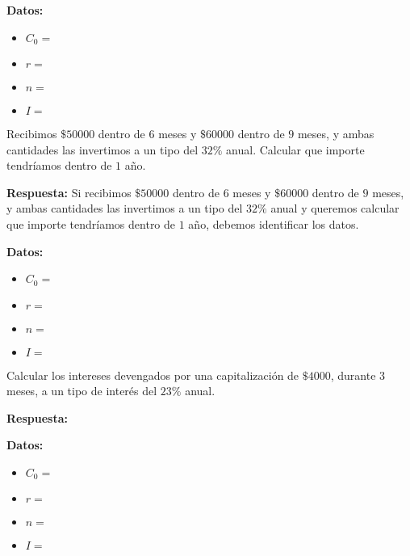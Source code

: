 \documentclass[12pt]{examdesign}
\theoremstyle{plain}
\theoremstyle{definition}
\theoremstyle{remark}
\begin{document}
\begin{shortanswer}[title={Leemos el material de consulta y realizamos las actividades propuestas.}, rearrange=no]
\begin{question}
\begin{answer}
        	    \textbf{Datos:}
        	    
        	    \begin{itemize}
        	    	\item $C_{0}=$
        	    	\item $r=$
        	    	\item $n=$
        	    	\item $I=$
        	    \end{itemize}
        	\end{answer}
        \end{question}
        
        \begin{question}
        	Recibimos $\$50000$ dentro de $6$ meses y $\$60000$ dentro de $9$ meses, y ambas cantidades las invertimos a un tipo del $32\%$ anual. Calcular que importe tendríamos dentro de $1$ año.
        	\begin{answer}
        		\textbf{Respuesta:} Si recibimos $\$50000$ dentro de $6$ meses y $\$60000$ dentro de $9$ meses, y ambas cantidades las invertimos a un tipo del $32\%$ anual y queremos calcular que importe tendríamos dentro de $1$ año, debemos identificar los datos.
        		
        		\textbf{Datos:}
        		\begin{itemize}
        			\item $C_{0}=$
        			\item $r=$
        			\item $n=$
        			\item $I=$
        		\end{itemize}
        	\end{answer}
        \end{question}
        
        \begin{question}
        	Calcular los intereses devengados por una capitalización de $\$4000$, durante 3 meses, a un tipo de interés del $23\%$ anual.
        	\begin{answer}
        		\textbf{Respuesta:}
        		
        		\textbf{Datos:}
        		\begin{itemize}
        			\item $C_{0}=$
        			\item $r=$
        			\item $n=$
        			\item $I=$
        		\end{itemize}
        	\end{answer}
        \end{question}
    

\end{shortanswer}
\end{document}
